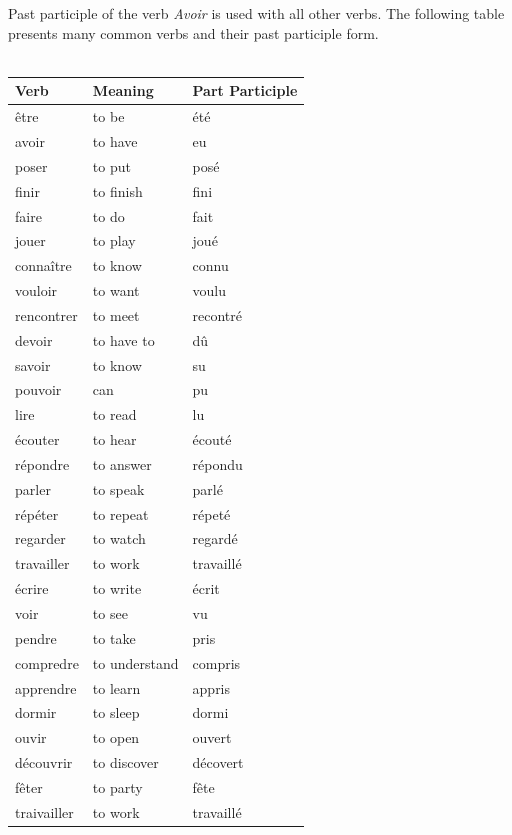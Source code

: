 \noindent Past participle of the verb \emph{Avoir} is used with all other verbs.
The following table presents many common verbs and their past participle form.\\\\

\begin{longtable}{| l | l | l |}
\hline
Verb            & Meaning             & Part Participle \\
\hline
\endhead
\^etre        & to be       & \'et\'e     \\ \hline
avoir         & to have     & eu          \\ \hline
poser         & to put      & pos\'e      \\ \hline
finir         & to finish   & fini        \\ \hline
faire         & to do       & fait        \\ \hline
jouer         & to play     & jou\'e      \\ \hline
conna\^itre   & to know     & connu       \\ \hline
vouloir       & to want     & voulu       \\ \hline
rencontrer    & to meet     & recontr\'e  \\ \hline
devoir        & to have to  & d\^u        \\ \hline
savoir        & to know     & su          \\ \hline
pouvoir       & can         & pu          \\ \hline
lire          & to read     & lu          \\ \hline
\'ecouter     & to hear     & \'ecout\'e  \\ \hline
r\'epondre    & to answer   & r\'epondu   \\ \hline
parler        & to speak    & parl\'e     \\ \hline
r\'ep\'eter   & to repeat   & r\'epet\'e  \\ \hline
regarder      & to watch    & regard\'e   \\ \hline
travailler    & to work     & travaill\'e \\ \hline
\'ecrire      & to write    & \'ecrit     \\ \hline
voir          & to see      & vu          \\ \hline
pendre        & to take     & pris        \\ \hline
compredre     & to understand  & compris  \\ \hline
apprendre     & to learn    & appris      \\ \hline
dormir        & to sleep    & dormi       \\ \hline
ouvir         & to open     & ouvert      \\ \hline
d\'ecouvrir   & to discover & d\'ecovert  \\ \hline
f\^eter       & to party    & f\^ete      \\ \hline
traivailler   & to work     & travaill\'e \\ \hline
\end{longtable}

